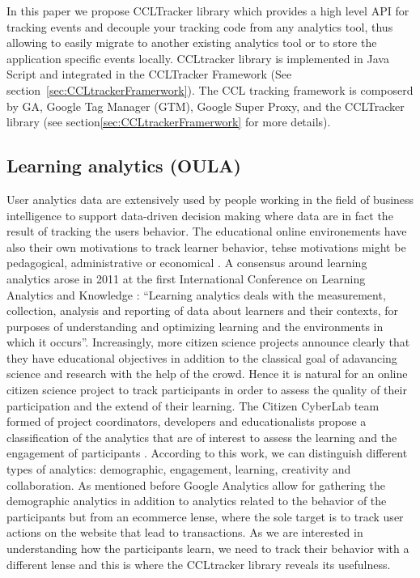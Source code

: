 \documentclass{article}
\begin{document}


In this paper we propose CCLTracker library which provides a high level API for tracking events and decouple your tracking code from any analytics tool, thus allowing to easily migrate to another existing analytics tool or to store the application specific events locally. CCLtracker library is implemented in Java Script and integrated in the CCLTracker Framework (See section~\ref{sec:CCLtrackerFramerwork}). The CCL tracking framework is composerd by GA, Google Tag Manager (GTM), Google Super Proxy, and the CCLTracker library (see section\ref{sec:CCLtrackerFramerwork} for more details). 


\subsection{Learning analytics (OULA)}
User analytics data are extensively used by people working in the field of business intelligence to support data-driven decision making where data are in fact the result of tracking the users behavior. The educational online environements have also their own motivations to track learner behavior, tehse motivations might be pedagogical, administrative or economical \cite{ferguson2012learning}.
A consensus around learning analytics arose in 2011 at the first  International Conference on Learning Analytics and Knowledge \cite{LAK11}: “Learning analytics deals with the measurement, collection, analysis and reporting of data about learners and their contexts, for purposes of understanding and optimizing learning and the environments in which it occurs”.
Increasingly, more citizen science projects announce clearly that they have educational objectives in addition to the classical goal of adavancing science and research with the help of the crowd. Hence it is natural for an online citizen science project to track  participants in order to assess the quality of their participation and the extend of their learning. The Citizen CyberLab team formed of  project coordinators, developers and educationalists propose a classification of the analytics that are of interest to assess the learning and the engagement of participants \cite{LAFW}. According to this work, we can distinguish different types of analytics: demographic, engagement, learning, creativity and collaboration. As mentioned before Google Analytics allow for gathering the demographic analytics in addition to analytics related to the behavior of the participants but from an ecommerce lense, where the sole target is to track user actions on the website that lead to transactions. As we are interested in understanding how the participants learn, we need to track their behavior with a different lense and this is where the CCLtracker library reveals its usefulness.
 
\end{document}
